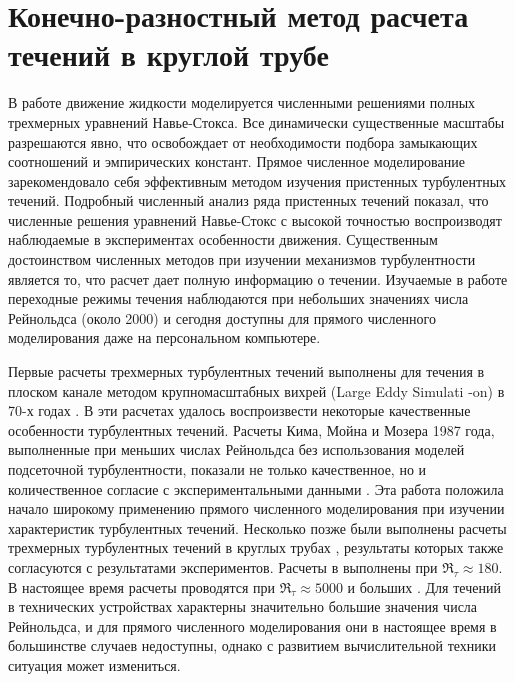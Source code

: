 
\chapter{Конечно-разностный метод расчета течений в круглой трубе}

В работе движение жидкости моделируется численными решениями полных трехмерных уравнений Навье-Стокса. Все динамически существенные масштабы разрешаются явно, что освобождает от необходимости подбора замыкающих соотношений и эмпирических констант. Прямое численное моделирование зарекомендовало себя эффективным методом изучения пристенных турбулентных течений. Подробный численный анализ ряда пристенных течений показал, что численные решения уравнений Навье-Стокс с высокой точностью воспроизводят наблюдаемые в экспериментах особенности движения. Существенным достоинством численных методов при изучении механизмов турбулентности является то, что расчет дает полную информацию о течении. Изучаемые в работе переходные режимы течения наблюдаются при небольших значениях числа Рейнольдса (около 2000) и сегодня доступны для прямого численного моделирования даже на персональном компьютере. 

Первые расчеты трехмерных турбулентных течений выполнены для течения в плоском канале методом крупномасштабных вихрей (Large Eddy Simula\-ti
-on) в 70-х годах \cite{Deardorff1970, Schumann1975, Moin1978, Moin1982}. В эти расчетах удалось воспроизвести некоторые качественные особенности турбулентных течений. Расчеты Кима, Мойна и Мозера 1987 года, выполненные при меньших числах Рейнольдса без использования моделей подсеточной турбулентности, показали не только качественное, но и количественное согласие с экспериментальными данными \cite{Kim1987}. Эта работа положила начало широкому применению прямого численного моделирования при изучении характеристик турбулентных течений. Несколько позже были выполнены расчеты трехмерных турбулентных течений в круглых трубах \cite{Pri1987, Pri1991, Nikitin1994b, Nikitin1996}, результаты которых также согласуются с результатами экспериментов. Расчеты в \cite{Kim1987} выполнены при $\Re_\tau \approx 180$. В настоящее время расчеты проводятся при $\Re_\tau \approx 5000$ и больших \cite{Ahn2015, Lee2015}. Для течений в технических устройствах характерны значительно большие значения числа Рейнольдса, и для прямого численного моделирования они в настоящее время в большинстве случаев недоступны, однако с развитием вычислительной техники ситуация может измениться. 

